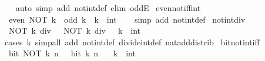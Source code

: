 \begin{isabellebody}
%
\isadelimproof
\ \ %
\endisadelimproof
%
\isatagproof
{}\isamarkupfalse%
\ {\isacharparenleft}{\kern0pt}auto\ simp\ add{\isacharcolon}{\kern0pt}\ not{\isacharunderscore}{\kern0pt}int{\isacharunderscore}{\kern0pt}def\ elim{\isacharcolon}{\kern0pt}\ oddE{\isacharparenright}{\kern0pt}%
\endisatagproof
{\isafoldproof}%
%
\isadelimproof
\isanewline
%
\endisadelimproof
\isanewline
{}\isamarkupfalse%
\ even{\isacharunderscore}{\kern0pt}not{\isacharunderscore}{\kern0pt}iff{\isacharunderscore}{\kern0pt}int{\isacharcolon}{\kern0pt}\isanewline
\ \ {\isacartoucheopen}even\ {\isacharparenleft}{\kern0pt}NOT\ k{\isacharparenright}{\kern0pt}\ {\isasymlongleftrightarrow}\ odd\ k{\isacartoucheclose}\ \ k\ {\isacharcolon}{\kern0pt}{\isacharcolon}{\kern0pt}\ int\isanewline
%
\isadelimproof
\ \ %
\endisadelimproof
%
\isatagproof
{}\isamarkupfalse%
\ {\isacharparenleft}{\kern0pt}simp\ add{\isacharcolon}{\kern0pt}\ not{\isacharunderscore}{\kern0pt}int{\isacharunderscore}{\kern0pt}def{\isacharparenright}{\kern0pt}%
\endisatagproof
{\isafoldproof}%
%
\isadelimproof
\isanewline
%
\endisadelimproof
\isanewline
{}\isamarkupfalse%
\ not{\isacharunderscore}{\kern0pt}int{\isacharunderscore}{\kern0pt}div{\isacharunderscore}{\kern0pt}{}{\isacharcolon}{\kern0pt}\isanewline
\ \ {\isacartoucheopen}NOT\ k\ div\ {}\ {\isacharequal}{\kern0pt}\ NOT\ {\isacharparenleft}{\kern0pt}k\ div\ {}{\isacharparenright}{\kern0pt}{\isacartoucheclose}\ \ k\ {\isacharcolon}{\kern0pt}{\isacharcolon}{\kern0pt}\ int\isanewline
%
\isadelimproof
\ \ %
\endisadelimproof
%
\isatagproof
{}\isamarkupfalse%
\ {\isacharparenleft}{\kern0pt}cases\ k{\isacharparenright}{\kern0pt}\ {\isacharparenleft}{\kern0pt}simp{\isacharunderscore}{\kern0pt}all\ add{\isacharcolon}{\kern0pt}\ not{\isacharunderscore}{\kern0pt}int{\isacharunderscore}{\kern0pt}def\ divide{\isacharunderscore}{\kern0pt}int{\isacharunderscore}{\kern0pt}def\ nat{\isacharunderscore}{\kern0pt}add{\isacharunderscore}{\kern0pt}distrib{\isacharparenright}{\kern0pt}%
\endisatagproof
{\isafoldproof}%
%
\isadelimproof
\isanewline
%
\endisadelimproof
\isanewline
{}\isamarkupfalse%
\ bit{\isacharunderscore}{\kern0pt}not{\isacharunderscore}{\kern0pt}int{\isacharunderscore}{\kern0pt}iff{\isacharcolon}{\kern0pt}\isanewline
\ \ {\isacartoucheopen}bit\ {\isacharparenleft}{\kern0pt}NOT\ k{\isacharparenright}{\kern0pt}\ n\ {\isasymlongleftrightarrow}\ {\isasymnot}\ bit\ k\ n{\isacartoucheclose}\isanewline
\ \ \ k\ {\isacharcolon}{\kern0pt}{\isacharcolon}{\kern0pt}\ int\isanewline

\end{isabellebody}
